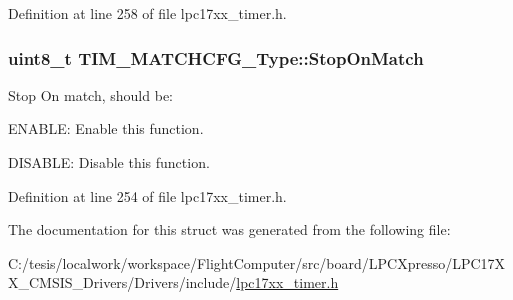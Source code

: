 \-Definition at line 258 of file lpc17xx\-\_\-timer.\-h.

\hypertarget{struct_t_i_m___m_a_t_c_h_c_f_g___type_a158b1f6cd2fca23885fab8f6be25ae83}{
\subsubsection[{\-Stop\-On\-Match}]{\setlength{\rightskip}{0pt plus 5cm}uint8\-\_\-t {\bf \-T\-I\-M\-\_\-\-M\-A\-T\-C\-H\-C\-F\-G\-\_\-\-Type\-::\-Stop\-On\-Match}}}\label{struct_t_i_m___m_a_t_c_h_c_f_g___type_a158b1f6cd2fca23885fab8f6be25ae83}
\-Stop \-On match, should be\-:
\begin{DoxyItemize}
\item \-E\-N\-A\-B\-L\-E\-: \-Enable this function.
\item \-D\-I\-S\-A\-B\-L\-E\-: \-Disable this function. 
\end{DoxyItemize}

\-Definition at line 254 of file lpc17xx\-\_\-timer.\-h.



\-The documentation for this struct was generated from the following file\-:\begin{DoxyCompactItemize}
\item 
\-C\-:/tesis/localwork/workspace/\-Flight\-Computer/src/board/\-L\-P\-C\-Xpresso/\-L\-P\-C17\-X\-X\-\_\-\-C\-M\-S\-I\-S\-\_\-\-Drivers/\-Drivers/include/\hyperlink{lpc17xx__timer_8h}{lpc17xx\-\_\-timer.\-h}\end{DoxyCompactItemize}
